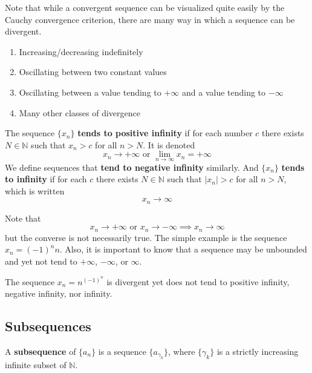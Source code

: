 \documentclass{article}
\begin{document}
    Note that while a convergent sequence can be visualized quite easily by the Cauchy convergence criterion, there are many way in which a sequence can be divergent. 
    \begin{enumerate}
      \item Increasing/decreasing indefinitely
      \item Oscillating between two constant values
      \item Oscillating between a value tending to $+\infty$ and a value tending to $-\infty$
      \item Many other classes of divergence
    \end{enumerate}

    \begin{definition}
      The sequence $\{x_n\}$ \textbf{tends to positive infinity} if for each number $c$ there exists $N \in \mathbb{N}$ such that $x_n > c$ for all $n > N$. It is denoted 
      \[x_n \rightarrow + \infty \text{ or } \lim_{n \rightarrow \infty} x_n = + \infty\]
      We define sequences that \textbf{tend to negative infinity} similarly. And $\{x_n\}$ \textbf{tends to infinity} if for each $c$ there exists $N \in \mathbb{N}$ such that $|x_n| > c$ for all $n > N$, which is written 
      \[x_n \rightarrow \infty\]
    \end{definition}

    Note that 
    \[x_n \rightarrow +\infty \text{ or } x_n \rightarrow -\infty \implies x_n \rightarrow \infty\]
    but the converse is not necessarily true. The simple example is the sequence $x_n = (-1)^n n$. Also, it is important to know that a sequence may be unbounded and yet not tend to $+\infty$, $-\infty$, or $\infty$. 

    \begin{example}
      The sequence $x_n = n^{(-1)^n}$ is divergent yet does not tend to positive infinity, negative infinity, nor infinity. 
    \end{example}

  \subsection{Subsequences}

    \begin{definition}[Subsequences]
      A \textbf{subsequence} of $\{ a_n\}$ is a sequence $\{a_{\gamma_k}\}$, where $\{\gamma_k\}$ is a strictly increasing infinite subset of $\mathbb{N}$. 
    \end{definition}
\end{document}
